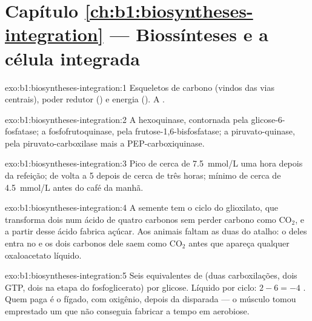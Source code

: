 \section*{Capítulo \ref{ch:b1:biosyntheses-integration} --- Biossínteses e a célula integrada}

\begin{solution}{exo:b1:biosyntheses-integration:1}
Esqueletos de carbono (vindos das vias centrais), poder redutor ()
e energia (). A .
\end{solution}

\begin{solution}{exo:b1:biosyntheses-integration:2}
A hexoquinase, contornada pela glicose-6-fosfatase; a fosfofrutoquinase,
pela frutose-1,6-bisfosfatase; a piruvato-quinase, pela
piruvato-carboxilase mais a PEP-carboxiquinase.
\end{solution}

\begin{solution}{exo:b1:biosyntheses-integration:3}
Pico de cerca de \qty{7.5}{mmol/L} uma hora depois da refeição; de volta
a \qty{5}{} depois de cerca de três horas; mínimo de cerca de
\qty{4.5}{mmol/L} antes do café da manhã.
\end{solution}

\begin{solution}{exo:b1:biosyntheses-integration:4}
A semente tem o ciclo do glioxilato, que transforma dois  num
ácido de quatro carbonos sem perder carbono como $\mathrm{CO_2}$, e a
partir desse ácido fabrica açúcar. Aos animais faltam as duas  do
atalho: o  deles entra no  e os dois carbonos
dele saem como $\mathrm{CO_2}$ antes que apareça qualquer oxaloacetato
líquido.
\end{solution}

\begin{solution}{exo:b1:biosyntheses-integration:5}
Seis equivalentes de  (duas carboxilações, dois GTP, dois  na
etapa do fosfoglicerato) por glicose. Líquido por ciclo:
$2 - 6 = -4$ . Quem paga é o fígado, com oxigênio, depois da
disparada --- o músculo tomou emprestado um  que não conseguia
fabricar a tempo em aerobiose.
\end{solution}

